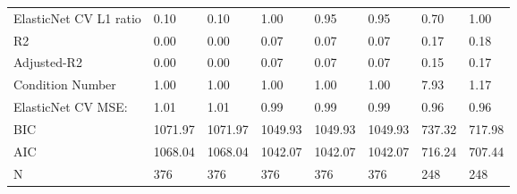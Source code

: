 \begin{table}
\begin{center}
\begin{tabular}{llllllll}
ElasticNet CV  L1 ratio                        & 0.10    & 0.10    & 1.00    & 0.95    & 0.95     & 0.70      & 1.00     \\
R2                                             & 0.00    & 0.00    & 0.07    & 0.07    & 0.07     & 0.17      & 0.18     \\
Adjusted-R2                                    & 0.00    & 0.00    & 0.07    & 0.07    & 0.07     & 0.15      & 0.17     \\
Condition Number                               & 1.00    & 1.00    & 1.00    & 1.00    & 1.00     & 7.93      & 1.17     \\
ElasticNet CV MSE:                             & 1.01    & 1.01    & 0.99    & 0.99    & 0.99     & 0.96      & 0.96     \\
BIC                                            & 1071.97 & 1071.97 & 1049.93 & 1049.93 & 1049.93  & 737.32    & 717.98   \\
AIC                                            & 1068.04 & 1068.04 & 1042.07 & 1042.07 & 1042.07  & 716.24    & 707.44   \\
N                                              & 376     & 376     & 376     & 376     & 376      & 248       & 248      \\
\hline
\end{tabular}
\end{center}
\end{table}